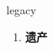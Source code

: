 
\begin{frame}
{\huge legacy}
\begin{center}
\begin{enumerate}\Large
  \item \textbf{遗产}
\end{enumerate}
\end{center}
\end{frame}

